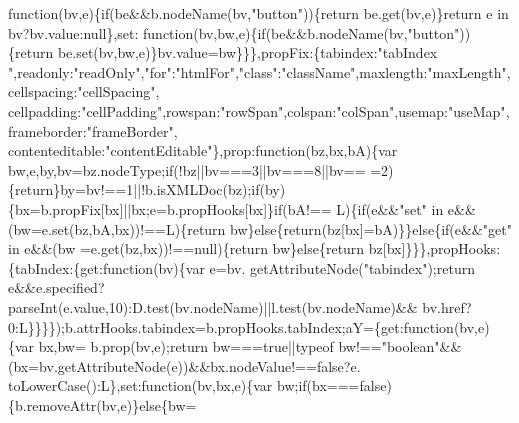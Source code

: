 \begin{DoxyCode}
{      function}(bv,e)\{\textcolor{keywordflow}{if}(be&&b.nodeName(bv,\textcolor{stringliteral}{"button"}))\{\textcolor{keywordflow}{return} be.get(bv,e)\}\textcolor{keywordflow}{return} e in bv?bv.value:null\},set:\textcolor{keyword}{
      function}(bv,bw,e)\{\textcolor{keywordflow}{if}(be&&b.nodeName(bv,\textcolor{stringliteral}{"button"}))\{\textcolor{keywordflow}{return} be.set(bv,bw,e)\}bv.value=bw\}\}\},propFix:\{tabindex:\textcolor{stringliteral}{"tabIndex
      "},readonly:\textcolor{stringliteral}{"readOnly"},\textcolor{stringliteral}{"for"}:\textcolor{stringliteral}{"htmlFor"},\textcolor{stringliteral}{"class"}:\textcolor{stringliteral}{"className"},maxlength:\textcolor{stringliteral}{"maxLength"},cellspacing:\textcolor{stringliteral}{"cellSpacing"},
      cellpadding:\textcolor{stringliteral}{"cellPadding"},rowspan:\textcolor{stringliteral}{"rowSpan"},colspan:\textcolor{stringliteral}{"colSpan"},usemap:\textcolor{stringliteral}{"useMap"},frameborder:\textcolor{stringliteral}{"frameBorder"},
      contenteditable:\textcolor{stringliteral}{"contentEditable"}\},prop:\textcolor{keyword}{function}(bz,bx,bA)\{var bw,e,by,bv=bz.nodeType;\textcolor{keywordflow}{if}(!bz||bv===3||bv===8||bv==
      =2)\{\textcolor{keywordflow}{return}\}by=bv!==1||!b.isXMLDoc(bz);\textcolor{keywordflow}{if}(by)\{bx=b.propFix[bx]||bx;e=b.propHooks[bx]\}\textcolor{keywordflow}{if}(bA!==
      L)\{\textcolor{keywordflow}{if}(e&&\textcolor{stringliteral}{"set"} in e&&(bw=e.set(bz,bA,bx))!==L)\{\textcolor{keywordflow}{return} bw\}\textcolor{keywordflow}{else}\{\textcolor{keywordflow}{return}(bz[bx]=bA)\}\}\textcolor{keywordflow}{else}\{\textcolor{keywordflow}{if}(e&&\textcolor{stringliteral}{"get"} in e&&(bw
      =e.get(bz,bx))!==null)\{\textcolor{keywordflow}{return} bw\}\textcolor{keywordflow}{else}\{\textcolor{keywordflow}{return} bz[bx]\}\}\},propHooks:\{tabIndex:\{\textcolor{keyword}{get}:\textcolor{keyword}{function}(bv)\{var e=bv.
      getAttributeNode(\textcolor{stringliteral}{"tabindex"});\textcolor{keywordflow}{return} e&&e.specified?parseInt(e.value,10):D.test(bv.nodeName)||l.test(bv.nodeName)&&
      bv.href?0:L\}\}\}\});b.attrHooks.tabindex=b.propHooks.tabIndex;aY=\{\textcolor{keyword}{get}:\textcolor{keyword}{function}(bv,e)\{var bx,bw=
      b.prop(bv,e);\textcolor{keywordflow}{return} bw===\textcolor{keyword}{true}||typeof bw!==\textcolor{stringliteral}{"boolean"}&&(bx=bv.getAttributeNode(e))&&bx.nodeValue!==\textcolor{keyword}{false}?e.
      toLowerCase():L\},set:\textcolor{keyword}{function}(bv,bx,e)\{var bw;\textcolor{keywordflow}{if}(bx===\textcolor{keyword}{false})\{b.removeAttr(bv,e)\}\textcolor{keywordflow}{else}\{bw=

\end{DoxyCode}
